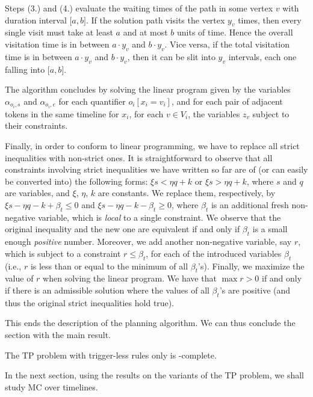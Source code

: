 Steps (3.) and (4.) evaluate the waiting times of the path in some
vertex $v$ with duration interval $\mathopen[a,b\mathclose]$.
If the solution path visits the vertex $y_v$ times, then every single
visit must take at least $a$ and at most $b$ units of time.
Hence the overall visitation time is in between $a\cdot y_v$ and
$b\cdot y_v$.
Vice versa, if the total visitation time is in between $a\cdot y_v$ and
 $b\cdot y_v$, then it can be slit into $y_v$ intervals, each one falling into $\mathopen[a,b\mathclose]$. 

The algorithm concludes by solving the linear program given by the variables $\alpha_{o_i,s}$ and $\alpha_{o_i,e}$ for each quantifier $o_i[x_i=v_i]$, and for each pair of adjacent tokens in the same timeline for $x_i$, for each $v\in V_i$, the variables $z_v$ subject to their constraints.

Finally, in order to conform to linear programming, we have to replace all strict inequalities with non-strict ones.
It is straightforward to observe that all constraints involving strict inequalities we have written so far are of
(or can easily be converted into) the following forms: 
$\xi s<\eta q+k$ or $\xi s>\eta q+k$, where $s$ and $q$ are variables, and $\xi$, $\eta$, $k$ are constants.
We replace them, respectively, by $\xi s-\eta q-k+\beta_t\leq 0$ and $\xi s-\eta q-k-\beta_t\geq 0$, where $\beta_t$ is an additional fresh non-negative variable, which is \emph{local} to a single constraint. 
We observe that the original inequality and the new one are equivalent if and only if $\beta_t$ is a small enough \emph{positive} number.
Moreover, we add another non-negative variable, say $r$, which is subject to a constraint $r\leq \beta_t$, for each of the introduced variables $\beta_t$ (i.e., $r$ is less than or equal to the minimum of all $\beta_t$'s). Finally, we maximize the value of $r$ when solving the linear program. We have that $\max r>0$ if and only if there is an admissible solution where the values of all $\beta_t$'s are positive (and thus the original strict inequalities hold true). 

This ends the description of the planning algorithm. We can thus conclude the section with the main result.
\begin{theorem}
The TP problem with trigger-less rules only is \NP-complete.
\end{theorem}

In the next section, using the results on the variants of the TP problem, we shall study MC over timelines.